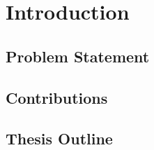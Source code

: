 \chapter{Introduction}
\label{cha:intro}

\section{Problem Statement}

\section{Contributions}

\section{Thesis Outline}